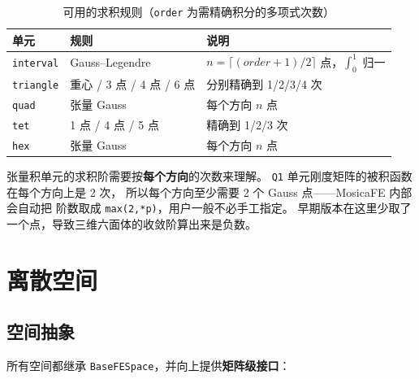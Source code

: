 \documentclass[UTF8,11pt,oneside]{ctexbook}
\theoremstyle{definition}
\theoremstyle{plain}
\newenvironment{caution}{%
  \begin{tcolorbox}[colback=orange!5,colframe=orange!55,title=注意,fonttitle=\bfseries]%
}{%
  \end{tcolorbox}%
}
\newcommand{\mosica}{\textsf{MosicaFE}}
\newcommand{\code}[1]{\texttt{#1}}
\begin{document}
\begin{table}[htbp]
\centering
\caption{可用的求积规则（\code{order} 为需精确积分的多项式次数）}
\label{tab:quad}
\begin{lrbox}{\guideTableBox}
\begin{tabular}{@{}lll@{}}
\toprule
单元 & 规则 & 说明 \\
\midrule
\code{interval} & Gauss--Legendre & $n=\lceil(order+1)/2\rceil$ 点，$\int_0^1$ 归一 \\
\code{triangle} & 重心 / 3 点 / 4 点 / 6 点 & 分别精确到 1/2/3/4 次 \\
\code{quad} & 张量 Gauss & 每个方向 $n$ 点 \\
\code{tet} & 1 点 / 4 点 / 5 点 & 精确到 1/2/3 次 \\
\code{hex} & 张量 Gauss & 每个方向 $n$ 点 \\
\bottomrule
\end{tabular}
\end{lrbox}%
\ifdim\wd\guideTableBox>\linewidth
  \resizebox{\linewidth}{!}{\usebox{\guideTableBox}}%
\else\usebox{\guideTableBox}\fi
\end{table}

\begin{caution}
张量积单元的求积阶需要按\textbf{每个方向}的次数来理解。
\code{Q1} 单元刚度矩阵的被积函数在每个方向上是 2 次，
所以每个方向至少需要 2 个 Gauss 点——\mosica{} 内部会自动把
阶数取成 \code{max(2,*p)}，用户一般不必手工指定。
早期版本在这里少取了一个点，导致三维六面体的收敛阶算出来是负数。
\end{caution}

\chapter{离散空间}
\label{chap:spaces}

\section{空间抽象}

所有空间都继承 \code{BaseFESpace}，并向上提供\textbf{矩阵级接口}：
\end{document}
